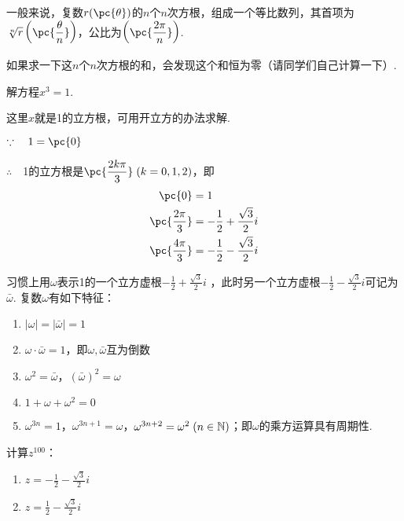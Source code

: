 一般来说，复数$r(\pc{\theta})$的$n$个$n$次方根，组成一个等比数列，其首项为$\sqrt[n]{r}\left(\pc{\frac{\theta}{n}}\right)$，公比为$\left(\pc{\frac{2\pi}{n}}\right)$.

如果求一下这$n$个$n$次方根的和，会发现这个和恒为零（请同学们自己计算一下）.

\begin{example}
    解方程$x^3=1$.
\end{example}

\begin{analyze}
这里$x$就是1的立方根，可用开立方的办法求解.
\end{analyze}

\begin{solution}
$\because\quad 1=\pc{0}$

$\therefore\quad$1的立方根是$\pc{\frac{2k\pi}{3}}\; (k=0,1,2)$，即
\[\begin{split}
    \pc{0}&=1\\
    \pc{\frac{2\pi}{3}}&=-\frac{1}{2}+\frac{\sqrt{3}}{2}i\\
    \pc{\frac{4\pi}{3}}&=-\frac{1}{2}-\frac{\sqrt{3}}{2}i\\
\end{split}\]
\end{solution}

\begin{note}
习惯上用$\omega$表示1的一个立方虚根$-\frac{1}{2}+\frac{\sqrt{3}}{2}i$
    ，此时另一个立方虚根$-\frac{1}{2}-\frac{\sqrt{3}}{2}i$可记为$\bar\omega$. 复数$\omega$有如下特征：
\begin{enumerate}[(1)]
    \item   $|\omega|=|\bar\omega|=1$
    \item $\omega\cdot \bar\omega=1$，即$\omega,\bar\omega$互为倒数
    \item $\omega^2=\bar\omega$，$(\bar\omega)^2=\omega$
    \item $1+\omega+\omega^2=0$
    \item $\omega^{3n}=1$，$\omega^{3n+1}=\omega$，$\omega^{3n+2}=\omega^2\; (n\in\mathbb{N})$；即$\omega$的乘方运算具有周期性. 
\end{enumerate}
\end{note}

\begin{example}
计算$z^{100}$：
\begin{multicols}{2}
\begin{enumerate}[(1)]
    \item $z=-\frac{1}{2}-\frac{\sqrt{3}}{2}i$
    \item $z=\frac{1}{2}-\frac{\sqrt{3}}{2}i$
\end{enumerate}
\end{multicols}
\end{example}

